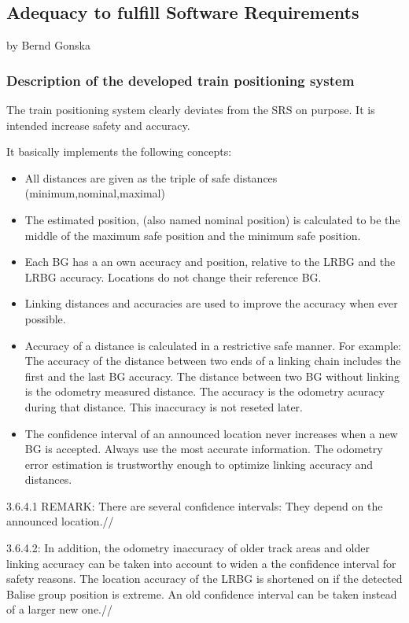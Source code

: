 \subsection{Adequacy to fulfill Software Requirements}
by Bernd Gonska

\subsubsection{Description of the developed train positioning system}
The train positioning system clearly deviates from the SRS on purpose. It is intended increase safety and accuracy.

It basically implements the following concepts:
\begin{itemize}
\item All distances are given as the triple of safe distances (minimum,nominal,maximal)

\item The estimated position, (also named nominal position) is calculated to be the middle of the maximum safe position and the minimum safe position.

\item Each BG has a an own accuracy and position, relative to the LRBG and the LRBG accuracy. Locations do not change their reference BG.
  
\item Linking distances and accuracies are used to improve the accuracy when ever possible.

\item Accuracy of a distance is calculated in a restrictive safe manner. For example: The accuracy of the distance between two ends of a linking chain includes the first and the last BG accuracy. The distance between two BG without linking is the odometry measured distance. The accuracy is the odometry acuracy during that distance. This inaccuracy is not reseted later.

\item The confidence interval of an announced location never increases when a new BG is accepted. Always use the most accurate information. The odometry error estimation is trustworthy enough to optimize linking accuracy and distances.
\end{itemize}

3.6.4.1 REMARK: There are several confidence intervals: They depend on the announced location.//

3.6.4.2: In addition, the odometry inaccuracy of older track areas and older linking accuracy can be taken into account to widen a the confidence interval for safety reasons. The location accuracy of the LRBG is shortened on if the detected Balise group position is extreme. An old confidence interval can be taken instead of a larger new one.//


